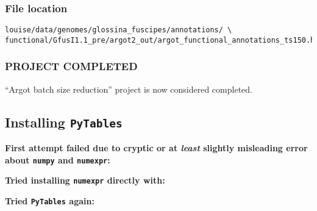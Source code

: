\documentclass[letterpaper]{scrartcl}
\newenvironment{Shaded}{}{}
\newcommand{\KeywordTok}[1]{\textcolor[rgb]{0.00,0.44,0.13}{\textbf{{#1}}}}
\newcommand{\NormalTok}[1]{{#1}}
\begin{document}
\subsubsection{File location}\label{file-location}

\begin{verbatim}
louise/data/genomes/glossina_fuscipes/annotations/ \
functional/GfusI1.1_pre/argot2_out/argot_functional_annotations_ts150.h5
\end{verbatim}

\subsubsection{PROJECT COMPLETED}\label{project-completed}

``Argot batch size reduction'' project is now considered completed.

\subsection{Installing \texttt{PyTables}}\label{installing-pytables}

\textbf{First attempt failed due to cryptic or at \emph{least} slightly
misleading error about \texttt{numpy} and \texttt{numexpr}:}

\begin{Shaded}
\end{Shaded}

\textbf{Tried installing \texttt{numexpr} directly with:}

\begin{Shaded}
\end{Shaded}

\textbf{Tried \texttt{PyTables} again:}

\begin{Shaded}
\end{Shaded}
\end{document}
